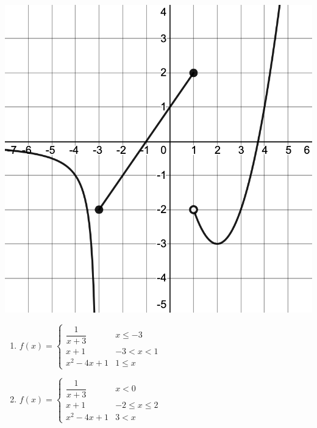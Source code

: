 \documentclass{article}
\begin{document}
\begin{enumerate}
        \begin{multicols}{2}
        \includegraphics[scale=.25]{images/piecewise_limits_RAT.png}


        \begin{enumerate}[label=\Alph*),itemsep=5pt]


              \item $ f(x) = \begin{cases} 
                      \dfrac{1}{x+3}    & x \leq -3 \\
                      x+1               & -3 < x < 1 \\
                      x^2-4x+1          & 1 \leq x 
                      \end{cases}$ %

              \item $ f(x) = \begin{cases} 
                      \dfrac{1}{x+3}    & x < 0 \\
                      x+1               & -2\leq x \leq 2 \\
                      x^2-4x+1          & 3 < x 
                      \end{cases}$ %


\end{enumerate}
\end{multicols}
\end{enumerate}
\end{document}
